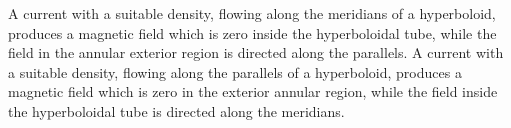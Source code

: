 A current with a suitable density, flowing along the meridians of a hyperboloid, produces a magnetic field which is zero inside the hyperboloidal tube, while the field in the annular exterior region is directed along the parallels. A current with a suitable density, flowing along the parallels of a hyperboloid, produces a magnetic field which is zero in the exterior annular region, while the field inside the hyperboloidal tube is directed along the meridians.
